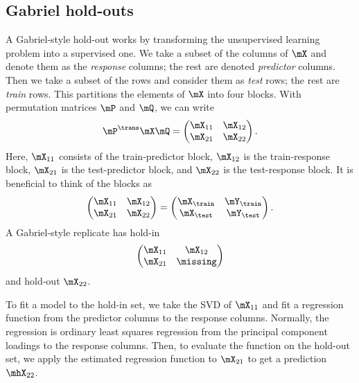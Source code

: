 \subsection{Gabriel hold-outs}

A Gabriel-style hold-out works by transforming the unsupervised learning
problem into a supervised one. We take a subset of the columns of $\mX$ and
denote them as the \emph{response} columns; the rest are denoted
\emph{predictor} columns. Then we take a subset of the rows and consider them
as \emph{test} rows; the rest are \emph{train} rows. This partitions the
elements of $\mX$ into four blocks. With permutation matrices $\mP$ and $\mQ$,
we can write
\[
    \mP^\trans \mX \mQ
        =
        \left(
        \begin{matrix}
           \mX_{11} & \mX_{12} \\
           \mX_{21} & \mX_{22}
        \end{matrix}
        \right).
\]
Here, $\mX_{11}$ consists of the train-predictor block, $\mX_{12}$ is the train-response block, $\mX_{21}$ is the test-predictor block, and $\mX_{22}$ is the test-response block.  It is beneficial to think of the blocks as
\[
    \left(
    \begin{matrix}
       \mX_{11} & \mX_{12} \\
       \mX_{21} & \mX_{22}
    \end{matrix}
    \right)
        =
        \left(
        \begin{matrix}
           \mX_\train & \mY_\train \\
           \mX_\test  & \mY_\test 
        \end{matrix}
        \right).
\]
A Gabriel-style replicate has hold-in
\[
\left(
    \begin{matrix}
       \mX_{11} & \mX_{12} \\
       \mX_{21} & \missing
    \end{matrix}
    \right)
\]
and hold-out $\mX_{22}$.

To fit a model to the hold-in set, we take the SVD of $\mX_{11}$ and fit a 
regression function from the predictor columns to the response columns.  
Normally, the regression is ordinary least squares regression from the 
principal component loadings to the response columns.  Then, to evaluate the 
function on the hold-out set, we apply the estimated regression function to 
$\mX_{21}$ to get a prediction $\mhX_{22}$.

